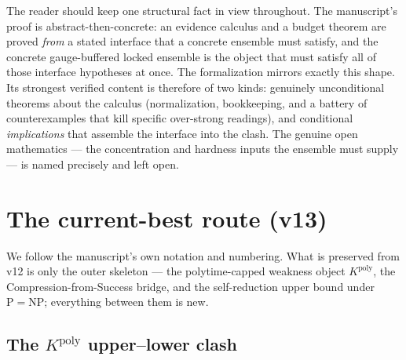 \documentclass[11pt]{article}
\theoremstyle{definition}
\newcommand{\Kpoly}{K^{\mathrm{poly}}}
\begin{document}
The reader should keep one structural fact in view throughout. The manuscript's
proof is abstract-then-concrete: an evidence calculus and a budget theorem are
proved \emph{from} a stated interface that a concrete ensemble must satisfy, and
the concrete gauge-buffered locked ensemble is the object that must satisfy all of
those interface hypotheses at once. The formalization mirrors exactly this shape.
Its strongest verified content is therefore of two kinds: genuinely unconditional
theorems about the calculus (normalization, bookkeeping, and a battery of
counterexamples that kill specific over-strong readings), and conditional
\emph{implications} that assemble the interface into the clash. The genuine open
mathematics --- the concentration and hardness inputs the ensemble must supply ---
is named precisely and left open.

\section{The current-best route (v13)}
\label{sec:route}

We follow the manuscript's own notation and numbering. What is preserved from v12
is only the outer skeleton --- the polytime-capped weakness object $\Kpoly$, the
Compression-from-Success bridge, and the self-reduction upper bound under
$\mathrm{P}=\mathrm{NP}$; everything between them is new.

\subsection{The $\Kpoly$ upper--lower clash}
\label{sec:clash}
\end{document}
